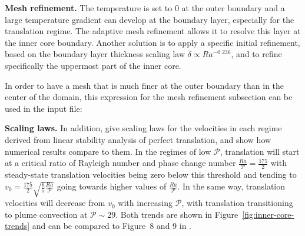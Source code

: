 \documentclass{article}
\begin{document}
\vspace{0.3cm}
\textbf{Mesh refinement.}
The temperature is set to 0 at the outer boundary and a large temperature gradient can develop at the boundary layer, especially for the translation regime. The adaptive mesh refinement allows it to resolve this layer at the inner core boundary. Another solution is to apply a specific initial refinement, based on the boundary layer thickness scaling law $\delta \propto Ra^{-0.236}$, and to refine specifically the uppermost part of the inner core. 

In order to have a mesh that is much finer at the outer boundary than in the center of the domain, this expression for the mesh refinement subsection can be used in the input file:


\vspace{0.3cm}
\textbf{Scaling laws.} 
In addition, \cite{Deguen2013} give scaling laws for the velocities in each regime derived from linear stability 
analysis of perfect translation, and show how numerical results compare to them. In the regimes of low $\mathcal{P}$, translation will start 
at a critical ratio of Rayleigh number and phase change number $\frac{Ra}{\mathcal{P}}=\frac{175}{2}$ with steady-state 
translation velocities being zero below this threshold and tending to $v_0=\frac{175}{2}\sqrt{\frac{6}{5}\frac{Ra}{\mathcal{P}}}$ 
going towards higher values of $\frac{Ra}{\mathcal{P}}$.
In the same way, translation velocities will decrease from $v_0$ with increasing $\mathcal{P}$, with translation transitioning
to plume convection at $\mathcal{P}\sim29$. 
Both trends are shown in Figure~\ref{fig:inner-core-trends} and can be compared to Figure~8 and 9 in \cite{Deguen2013}.
 
\end{document}
